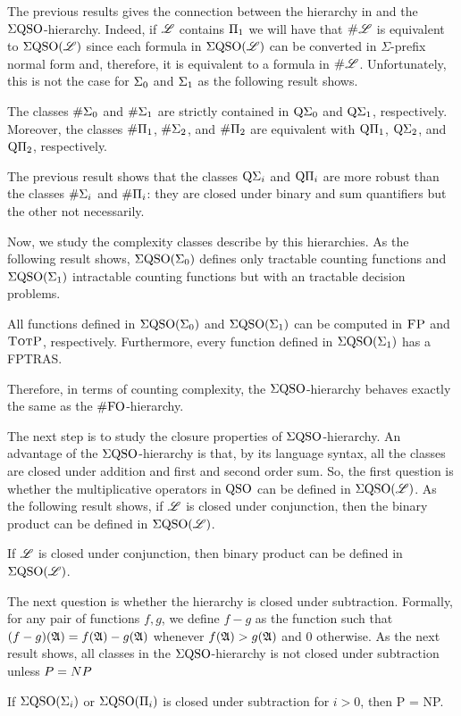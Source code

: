 The previous results gives the connection between the hierarchy in \cite{SalujaST95} and the $\Sigma{\rm QSO}$-hierarchy. 
Indeed, if $\mathscr{L}$ contains $\Pi_{1}$ we will have that $\text{\sc \#} \mathscr{L}$ is equivalent to $\Sigma{\rm QSO}(\mathscr{L})$ since each formula in $\Sigma{\rm QSO}(\mathscr{L})$ can be converted in $\Sigma$-prefix normal form and, therefore, it is equivalent to a formula in $\text{\sc \#} \mathscr{L}$. 
Unfortunately, this is not the case for $\Sigma_{0}$ and $\Sigma_{1}$ as the following result shows.
\begin{proposition} \label{prop:sharp-Q-rel}
	The classes $\#\Sigma_{0}$ and $\#\Sigma_{1}$ are strictly contained in $\operatorname{Q}\!\Sigma_{0}$ and $\operatorname{Q}\!\Sigma_{1}$, respectively. Moreover, the classes $\#\Pi_{1}$, $\#\Sigma_{2}$, and $\#\Pi_{2}$ are equivalent with $\operatorname{Q}\!\Pi_{1}$, $\operatorname{Q}\!\Sigma_{2}$, and $\operatorname{Q}\!\Pi_{2}$, respectively.
\end{proposition}
The previous result shows that the classes $\operatorname{Q}\!\Sigma_{i}$ and $\operatorname{Q}\!\Pi_{i}$ are more robust than the classes $\#\Sigma_{i}$ and $\#\Pi_{i}$: they are closed under binary and sum quantifiers but the other not necessarily. 

Now, we study the complexity classes describe by this hierarchies. As the following result shows, $\Sigma{\rm QSO}(\Sigma_{0})$ defines only tractable counting functions and $\Sigma{\rm QSO}(\Sigma_{1})$ intractable counting functions but with an tractable decision problems. 
\begin{proposition} \label{prop:qe0-fp-qe1-totp-fptras}
All functions defined in $\Sigma{\rm QSO}(\Sigma_{0})$ and $\Sigma{\rm QSO}(\Sigma_{1})$ can be computed in $\text{\sc FP}$ and $\text{\sc TotP}$, respectively. Furthermore, every function defined in $\Sigma{\rm QSO}(\Sigma_{1})$ has a FPTRAS.
\end{proposition}
Therefore, in terms of counting complexity, the $\Sigma{\rm QSO}$-hierarchy behaves exactly the same as the $\#{\rm FO}$-hierarchy.

The next step is to study the closure properties of $\Sigma{\rm QSO}$-hierarchy. 
An advantage of the $\Sigma{\rm QSO}$-hierarchy is that, by its language syntax, all the classes are closed under addition and first and second order sum.
So, the first question is whether the multiplicative operators in ${\rm QSO}$ can be defined in $\Sigma{\rm QSO}(\mathscr{L})$. As the following result shows, if $\mathscr{L}$ is closed under conjunction, then the binary product can be defined in  $\Sigma{\rm QSO}(\mathscr{L})$.
\begin{theorem}\label{theo:binary-prod}
	If $\mathscr{L}$ is closed under conjunction, then binary product can be defined in $\Sigma{\rm QSO}(\mathscr{L})$.
\end{theorem}
The next question is whether the hierarchy is closed under subtraction. Formally, for any pair of functions $f,g$, we define $f - g$ as the function such that $(f - g)(\mathfrak{A}) = f(\mathfrak{A})-g(\mathfrak{A})$ whenever $f(\mathfrak{A})>g(\mathfrak{A})$ and $0$ otherwise.
As the next result shows, all classes in the $\Sigma{\rm QSO}$-hierarchy is not closed under subtraction unless ${\sc P} = {\sc NP}$
\begin{theorem} \label{sub-pnp}
If $\Sigma{\rm QSO}(\Sigma_{i})$ or $\Sigma{\rm QSO}(\Pi_{i})$ is closed under subtraction for $i > 0$, then {\sc P} = {\sc NP}.
\end{theorem}

